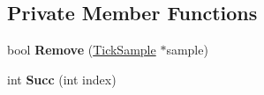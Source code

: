 \subsection*{Private Member Functions}
\begin{DoxyCompactItemize}
\item 
bool {\bfseries Remove} (\hyperlink{structv8_1_1internal_1_1_tick_sample}{Tick\+Sample} $\ast$sample)\hypertarget{classv8_1_1internal_1_1_profiler_ad617333ed946a4c733145a00af70941f}{}\label{classv8_1_1internal_1_1_profiler_ad617333ed946a4c733145a00af70941f}

\item 
int {\bfseries Succ} (int index)\hypertarget{classv8_1_1internal_1_1_profiler_aa10408a7e48618ceb2c9dfa3f9eb6ca6}{}\label{classv8_1_1internal_1_1_profiler_aa10408a7e48618ceb2c9dfa3f9eb6ca6}

\end{DoxyCompactItemize}
